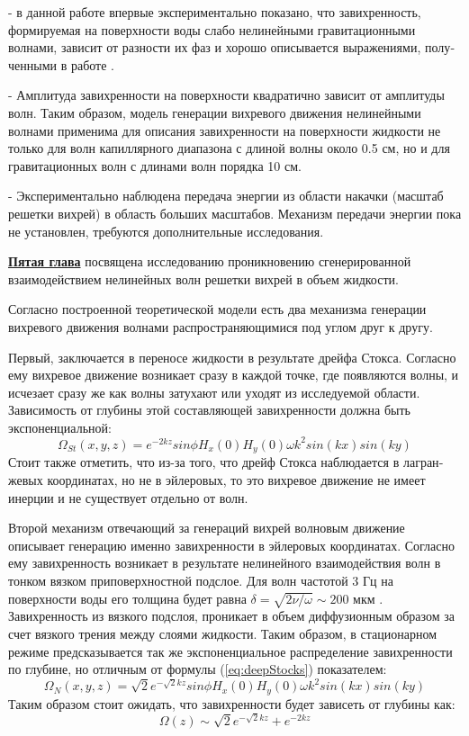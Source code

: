  - в данной работе впервые экспериментально показано, что завихренность,
формируемая на поверхности воды слабо нелинейными гравитационными волнами, зависит от разности их фаз и хорошо описывается выражениями, полу­ченными в работе \cite{F6}.

 - Амплитуда завихренности на поверхности квадратично зависит от амплитуды волн. Таким образом, модель генерации вихревого движения нелинейными волнами применима для описания завихренности на поверх­ности жидкости не только для волн капиллярного диапазона с длиной волны около 0.5 см, но и для гравитационных волн с длинами волн порядка 10 см.
 
 - Экспериментально наблюдена передача энергии из области накачки (масштаб решетки вихрей) в область больших масштабов. Механизм передачи энергии пока не установлен, требуются дополнительные исследования.
 
 \underline{\textbf{Пятая глава}} посвящена исследованию проникновению сгенерированной взаимодействием нелинейных волн решетки вихрей в объем жидкости.
 
Согласно построенной теоретической модели есть два механизма генерации вихревого движения волнами распространяющимися под углом друг к другу.

Первый, заключается в переносе жидкости в результате дрейфа Стокса. Согласно ему вихревое движение возникает сразу в каждой точке, где появляются волны, и исчезает сразу же как волны затухают или уходят из исследуемой области. Зависимость от глубины этой составляющей завихренности должна быть экспоненциальной:
\begin{equation}
 \label{eq:deepStocks}
\Omega_{St}(x,y,z) = e^{-2kz} sin \phi H_x(0) H_y(0) \omega k^2 sin(kx)sin(ky)
\end{equation}
Стоит также отметить, что из-за того, что дрейф Стокса наблюдается в лагран­жевых координатах, но не в эйлеровых, то это вихревое движение не имеет инерции и не существует отдельно от волн.  

Второй механизм отвечающий за генераций вихрей волновым движение описывает генерацию именно завихренности в эйлеровых координатах. Согласно ему завихренность возникает в результате нелинейного взаимодействия волн в тонком вязком приповерхностной подслое. Для волн частотой 3 Гц на поверхности воды его толщина будет равна $\delta = \sqrt{2 \nu / \omega} \sim 200 $ мкм \cite{FalkovichBook}. Завихренность из вязкого подслоя, проникает в объем диффузионным образом за счет вязкого трения между слоями жидкости. Таким образом, в стационарном режиме предсказывается так же экспоненциальное распределение завихренности по глубине, но отличным от формулы (\ref{eq:deepStocks}) показателем:
\begin{equation}
 \label{eq:deepEyler}
\Omega_N(x,y,z) = \sqrt{2}e^{-\sqrt{2}kz} sin \phi H_x(0) H_y(0) \omega k^2 sin(kx)sin(ky)
\end{equation}
Таким образом стоит ожидать, что завихренности будет зависеть от глубины как:
\begin{equation}
 \label{eq:deepFull}
\Omega(z) \sim \sqrt{2}e^{-\sqrt{2}kz} +  e^{-2kz}
\end{equation}

